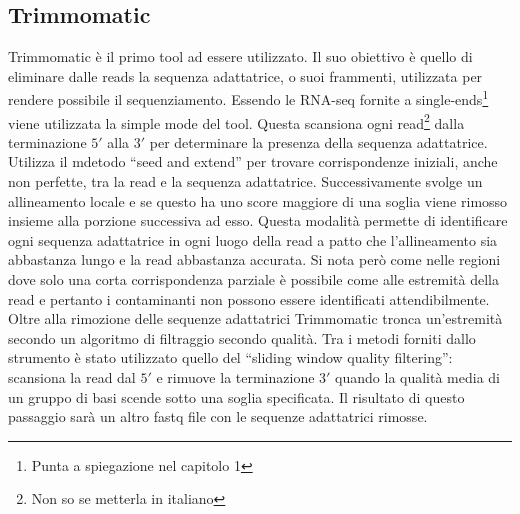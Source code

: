   	\subsection{Trimmomatic}
	Trimmomatic \cite{trimmomatic} \`e il primo tool ad essere utilizzato.
	Il suo obiettivo \`e quello di eliminare dalle reads la sequenza adattatrice, o suoi frammenti, utilizzata per rendere possibile il sequenziamento.
	Essendo le RNA-seq fornite a single-ends\footnote{Punta a spiegazione nel capitolo 1} viene utilizzata la simple mode del tool.
	Questa scansiona ogni read\footnote{Non so se metterla in italiano} dalla terminazione $5'$ alla $3'$ per determinare la presenza della sequenza adattatrice.
	Utilizza il mdetodo ``seed and extend'' per trovare corrispondenze iniziali, anche non perfette, tra la read e la sequenza adattatrice.
	Successivamente svolge un allineamento locale e se questo ha uno score maggiore di una soglia viene rimosso insieme alla porzione successiva ad esso.
	Questa modalit\`a permette di identificare ogni sequenza adattatrice in ogni luogo della read a patto che l'allineamento sia abbastanza lungo e la read abbastanza accurata.
	Si nota per\`o come nelle regioni dove solo una corta corrispondenza parziale \`e possibile come alle estremit\`a della read e pertanto i contaminanti non possono essere identificati attendibilmente.
	Oltre alla rimozione delle sequenze adattatrici Trimmomatic tronca un'estremit\`a secondo un algoritmo di filtraggio secondo qualit\`a.
	Tra i metodi forniti dallo strumento \`e stato utilizzato quello del ``sliding window quality filtering'':
	scansiona la read dal $5'$ e rimuove la terminazione $3'$ quando la qualit\`a media di un gruppo di basi scende sotto una soglia specificata.
	Il risultato di questo passaggio sar\`a un altro fastq file con le sequenze adattatrici rimosse.

